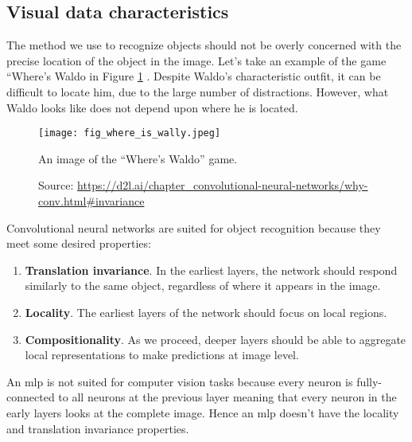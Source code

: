 \subsection{Visual data characteristics}
The method we use to recognize objects should not be overly concerned with the precise location of the object in the image. Let's take an example of the game “Where’s Waldo in Figure \ref{fig:where_is_wally} \cite{zhang2021dive}. Despite Waldo's characteristic outfit, it can be difficult to locate him, due to the large number of distractions. However, what Waldo looks like does not depend upon where he is located. 
\begin{figure}[ht]
    \begin{center}       
    \texttt{[image: fig\_where\_is\_wally.jpeg]}
    \caption[An image of the “Where’s Waldo” game]{An image of the “Where’s Waldo” game.}
    \caption*{Source: \href{https://d2l.ai/chapter\_convolutional-neural-networks/why-conv.html\#invariance}{https://d2l.ai/chapter\_convolutional-neural-networks/why-conv.html\#invariance}}
    \label{fig:where_is_wally}
    \end{center}
\end{figure}

Convolutional neural networks are suited for object recognition because they meet some desired properties:
\begin{enumerate}
    \item \textbf{Translation invariance}. In the earliest layers, the network should respond similarly to the same object, regardless of where it appears in the image. 
    \item \textbf{Locality}. The earliest layers of the network should focus on local regions.
    \item \textbf{Compositionality}. As we proceed, deeper layers should be able to aggregate local representations to make predictions at image level.
\end{enumerate}

An \acrshort{mlp} is not suited for computer vision tasks because every neuron is fully-connected to all neurons at the previous layer meaning that every neuron in the early layers looks at the complete image. Hence an \acrshort{mlp} doesn't have the locality and translation invariance properties.

